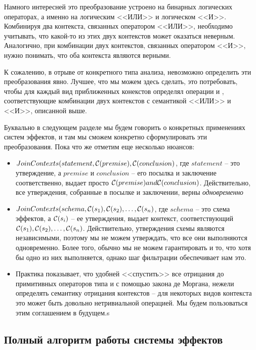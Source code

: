 Намного интересней это преобразование устроено на бинарных логических операторах, а именно на логическим <<ИЛИ>> и логическом <<И>>. Комбинируя два контекста, связанных оператором <<ИЛИ>>, необходимо учитывать, что какой-то из этих двух контекстов может оказаться неверным. Аналогично, при комбинации двух контекстов, связанных оператором <<И>>, нужно понимать, что оба контекста являются верными. 

К сожалению, в отрыве от конкретного типа анализа, невозможно определить эти преобразования явно. Лучшее, что мы можем здесь сделать, это потребовать, чтобы для каждый вид приближенных конекстов определял операции  и , соответствующие комбинации двух контекстов с семантикой <<ИЛИ>> и <<И>>, описанной выше.

Буквально в следующем разделе мы будем говорить о конкретных применениях систем эффектов, и там мы сможем конкретно сформулировать эти преобразования. Пока что же отметим еще несколько нюансов:

\begin{itemize}
	\item $JoinContexts(statement, \mathcal{C}(premise), \mathcal{C}(conclusion)$, где $statement$ -- это утверждение, а $premise$ и $conclusion$ -- его посылка и заключение соответственно, выдает просто $\mathcal{C}(premise) and \mathcal{C}(conclusion)$. Действительно, все утверждения, собранные в посылке и заключении, верны \emph{одновременно}
	
	\item $JoinContexts(schema, \mathcal{C}(s_1), \mathcal{C}(s_2), \ldots, \mathcal{C}(s_n)$, где $schema$ -- это схема эффектов, а $\mathcal{C}(s_i)$ -- ее утверждения, выдает контекст, соответствующий $\mathcal{C}(s_1), \mathcal{C}(s_2), \ldots, \mathcal{C}(s_n)$. Действительно, утверждения схемы являются независимыми, поэтому мы не можем утверждать, что все они выполняются одновременно. Более того, обычно мы не можем гарантировать и то, что хотя бы одно из них выполняется, однако шаг фильтрации обеспечивает нам это.
	
	\item Практика показывает, что удобней <<спустить>> все отрицания до примитивных операторов типа  и \code{!=} с помощью закона де Моргана, нежели определять семантику отрицания контекстов -- для некоторых видов контекста это может быть довольно нетривиальной операцией. Мы будем пользоваться этим соглашением в будущем.s
\end{itemize}




\subsection{Полный алгоритм работы системы эффектов}

